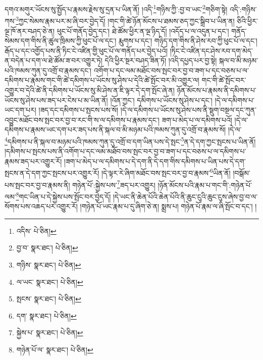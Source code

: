 དགའ་མགུར་ཡོངས་སུ་སྤྱོད་པ་རྣམས་རྗེས་སུ་དྲན་པ་ཡིན་ནོ། །འདི་\footnote{འདིས་  པེ་ཅིན། }གཉིས་ཀྱི་:བྱ་བ་ཡང་\footnote{བྱ་བ་  སྣར་ཐང་།  པེ་ཅིན། }གཅིག་སྟེ། འདི་:གཉིས་ཀས་\footnote{གཉིས་  སྣར་ཐང་།  པེ་ཅིན། }ཀྱང་སེམས་རྣམ་པར་མ་ཞི་བར་བྱེད་དོ། །གང་གི་ཚེ་ཉོན་མོངས་པ་ཐམས་ཅད་ཀྱང་སྒྲིབ་པ་ཡིན་ན། ཅིའི་ཕྱིར་ལྔ་ཁོ་ནར་བཤད་ཅེ་ན། ཕུང་པོ་གནོད་བྱེད་དང་། ཐེ་ཚོམ་ཕྱིར་ན་ལྔ་ཉིད་དོ། །འདོད་པ་ལ་འདུན་པ་དང་། གནོད་སེམས་དག་གིས་ནི་ཚུལ་ཁྲིམས་ཀྱི་ཕུང་པོ་ལ་དང་། རྨུགས་པ་དང་། གཉིད་དག་གིས་ནི་ཤེས་རབ་ཀྱི་ཕུང་པོ་ལ་དང་། རྒོད་པ་དང་འགྱོད་པས་ནི་ཏིང་ངེ་འཛིན་གྱི་ཕུང་པོ་ལ་གནོད་པར་བྱེད་པའོ། །ཏིང་ངེ་འཛིན་དང་ཤེས་རབ་དག་མེད་ན་བདེན་པ་དག་ལ་ཐེ་ཚོམ་ཟ་བར་འགྱུར་ཏེ། དེའི་ཕྱིར་སྔར་བཤད་ཟིན་ཏོ། །འདི་དཔྱད་པར་བྱ་སྟེ། སྐལ་བ་མི་མཉམ་པའི་ཁམས་ཀུན་དུ་འགྲོ་བ་རྣམས་དང་། འགོག་པ་དང་ལམ་མཐོང་བས་སྤང་བར་བྱ་བ་ཟག་པ་དང་བཅས་པ་ལ་དམིགས་པ་རྣམས་གང་གི་ཚེ་དམིགས་པ་ཡོངས་སུ་ཤེས་པ་དེའི་ཚེ་སྤོང་བར་མི་འགྱུར་ལ། གང་གི་ཚེ་སྤོང་བར་འགྱུར་བ་དེའི་ཚེ་ནི་དམིགས་པ་ཡོངས་སུ་མི་ཤེས་ན་ཇི་ལྟར་དེ་དག་སྤོང་ཞེ་ན། ཉོན་མོངས་པ་རྣམས་ནི་དམིགས་པ་ཡོངས་སུ་ཤེས་པས་ཟད་པར་ངེས་པ་མ་ཡིན་ནོ། །འོན་ཀྱང་། དམིགས་པ་ཡོངས་སུ་ཤེས་པ་དང་། །དེ་ལ་དམིགས་པ་ཡང་དག་པར། །ཟད་དང་དམིགས་པ་སྤངས་པས་སོ། །དེ་ལ་དམིགས་པ་ཡོངས་སུ་ཤེས་པས་ནི་སྡུག་བསྔལ་དང་ཀུན་འབྱུང་མཐོང་བས་སྤང་བར་བྱ་བ་རང་གི་ས་ལ་དམིགས་པ་རྣམས་དང་། ཟག་པ་མེད་པ་ལ་དམིགས་པའོ། །དེ་ལ་དམིགས་པ་རྣམས་ཡང་དག་པར་ཟད་པས་ནི་སྐལ་བ་མི་མཉམ་པའི་ཁམས་ཀུན་དུ་འགྲོ་བ་རྣམས་སོ། །དེ་ལ་\footnote{ལ་ཡང་  སྣར་ཐང་།  པེ་ཅིན། }དམིགས་པ་ནི་སྐལ་བ་མཉམ་པའི་ཁམས་ཀུན་དུ་འགྲོ་བ་དག་ཡིན་པས་དེ་སྤང་\footnote{སྤངས་  སྣར་ཐང་།  པེ་ཅིན། }ན་དེ་དག་ཀྱང་སྤངས་པ་ཡིན་ནོ། །དམིགས་པ་སྤངས་པས་ནི་འགོག་པ་དང་ལམ་མཐོབ་བས་སྤང་བར་བྱ་བ་ཟག་པ་དང་བཅས་པ་ལ་དམིགས་པ་རྣམས་ཟད་པར་འགྱུར་རོ། །ཟག་པ་མེད་པ་ལ་དམིགས་པ་དེ་དག་ནི་དེ་དག་གིས་དམིགས་པ་ཡིན་པས་དེ་དག་སྤངས་ན་དེ་དག་ཀྱང་སྤངས་པར་འགྱུར་རོ། །དེ་ལྟར་རེ་ཞིག་མཐོང་བས་སྤང་བར་བྱ་བ་རྣམས་\footnote{དག་  སྣར་ཐང་།  པེ་ཅིན། }ཡིན་ནོ། །བསྒོམ་པས་སྤང་བར་བྱ་བ་རྣམས་ནི། གཉེན་པོ་:སྐྱེས་པས་\footnote{སྐྱེས་པ་  སྣར་ཐང་།  པེ་ཅིན། }ཟད་པར་འགྱུར། །ཉོན་མོངས་པའི་རྣམ་པ་གང་གི་:གཉེན་པོ་ལམ་\footnote{གཉེན་པོ་ལ་  སྣར་ཐང་།  པེ་ཅིན། }གང་ཡིན་པ་དེ་སྐྱེས་པས་སྤོང་བར་བྱེད་དོ། །དེ་ཡང་ནི་ཆེན་པོའི་ཆེན་པོའི་ནི་ཆུང་ངུའི་ཆུང་ངུས་ཞེས་བྱ་བ་ལ་སོགས་པས་འཆད་པར་འགྱུར་རོ། །གཉེན་པོ་ཡང་རྣམ་པ་དུ་ཞིག་ཅེ་ན། སྨྲས་པ། གཉེན་པོ་རྣམ་ལ་ཞི་སྤོང་བ་དང་། །

